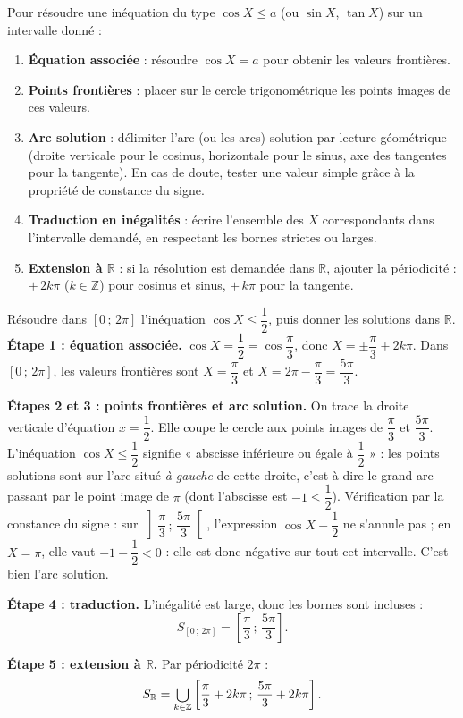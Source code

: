\documentclass[11pt]{article}
\newcounter{popsec}
\newcounter{popsub}
\newcommand{\courssub}[1]{%
  \stepcounter{popsub}%
  \par\vspace{9pt}\noindent{\popxbold\fontsize{11.5}{13}\selectfont\color{popink}{\color{poporange}\thepopsec.\thepopsub}\hspace{6pt}#1}\par\nopagebreak\vspace{4pt}
}
\def\bigcup{\mathop{\mathchoice{\raisebox{-0.3em}{\scalebox{1.7}{$\cup$}}}{\scalebox{1.25}{$\cup$}}{\cup}{\cup}}\displaylimits}%
\begin{document}
\begin{methode}
Pour résoudre une inéquation du type $\cos X \leq a$ (ou $\sin X$, $\tan X$) sur un intervalle donné :
\begin{enumerate}
\item \textbf{Équation associée} : résoudre $\cos X = a$ pour obtenir les valeurs frontières.
\item \textbf{Points frontières} : placer sur le cercle trigonométrique les points images de ces valeurs.
\item \textbf{Arc solution} : délimiter l'arc (ou les arcs) solution par lecture géométrique (droite verticale pour le cosinus, horizontale pour le sinus, axe des tangentes pour la tangente). En cas de doute, tester une valeur simple grâce à la propriété de constance du signe.
\item \textbf{Traduction en inégalités} : écrire l'ensemble des $X$ correspondants dans l'intervalle demandé, en respectant les bornes strictes ou larges.
\item \textbf{Extension à $\mathbb{R}$} : si la résolution est demandée dans $\mathbb{R}$, ajouter la périodicité : $+\,2k\pi$ ($k \in \mathbb{Z}$) pour cosinus et sinus, $+\,k\pi$ pour la tangente.
\end{enumerate}
\end{methode}

\courssub{Inéquations avec le cosinus}

\begin{exoresolu}
Résoudre dans $[0\,;\,2\pi]$ l'inéquation $\cos X \leq \dfrac{1}{2}$, puis donner les solutions dans $\mathbb{R}$.
\tcblower
\textbf{Étape 1 : équation associée.} $\cos X = \dfrac{1}{2} = \cos \dfrac{\pi}{3}$, donc $X = \pm \dfrac{\pi}{3} + 2k\pi$. Dans $[0\,;\,2\pi]$, les valeurs frontières sont $X = \dfrac{\pi}{3}$ et $X = 2\pi - \dfrac{\pi}{3} = \dfrac{5\pi}{3}$.

\textbf{Étapes 2 et 3 : points frontières et arc solution.} On trace la droite verticale d'équation $x = \dfrac{1}{2}$. Elle coupe le cercle aux points images de $\dfrac{\pi}{3}$ et $\dfrac{5\pi}{3}$. L'inéquation $\cos X \leq \dfrac{1}{2}$ signifie « abscisse inférieure ou égale à $\dfrac{1}{2}$ » : les points solutions sont sur l'arc situé \emph{à gauche} de cette droite, c'est-à-dire le grand arc passant par le point image de $\pi$ (dont l'abscisse est $-1 \leq \dfrac{1}{2}$). Vérification par la constance du signe : sur $\left]\dfrac{\pi}{3}\,;\,\dfrac{5\pi}{3}\right[$, l'expression $\cos X - \dfrac{1}{2}$ ne s'annule pas ; en $X = \pi$, elle vaut $-1 - \dfrac{1}{2} < 0$ : elle est donc négative sur tout cet intervalle. C'est bien l'arc solution.

\textbf{Étape 4 : traduction.} L'inégalité est large, donc les bornes sont incluses :
\[ S_{[0\,;\,2\pi]} = \left[\dfrac{\pi}{3}\,;\,\dfrac{5\pi}{3}\right]. \]

\textbf{Étape 5 : extension à $\mathbb{R}$.} Par périodicité $2\pi$ :
\[ S_{\mathbb{R}} = \bigcup_{k \in \mathbb{Z}} \left[\dfrac{\pi}{3} + 2k\pi\,;\,\dfrac{5\pi}{3} + 2k\pi\right]. \]
\end{exoresolu}
\end{document}
